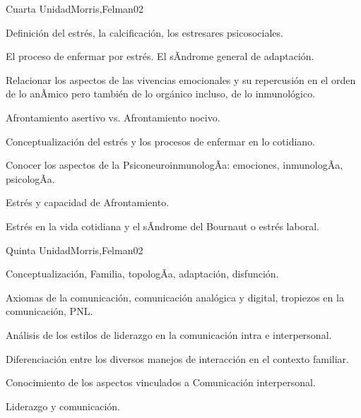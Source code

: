 \begin{syllabus}
\begin{unit}{Cuarta Unidad}{Morris,Felman}{0}{2}
\begin{topics}
	\item Definición del estrés, la calcificación, los estresares psicosociales.
	\item El proceso de enfermar por estrés. El sÃ­ndrome general de adaptación.
	\item Relacionar los aspectos de las vivencias emocionales y su repercusión en el orden de lo anÃ­mico pero también de lo orgánico incluso, de lo inmunológico.
	\item Afrontamiento asertivo vs. Afrontamiento nocivo.
\end{topics}
\begin{unitgoals}
	\item Conceptualización del estrés y los procesos de enfermar en lo cotidiano.
	\item Conocer los aspectos de la PsiconeuroinmunologÃ­a: emociones, inmunologÃ­a, psicologÃ­a.
	\item Estrés y capacidad de Afrontamiento.
	\item Estrés en la vida cotidiana y el sÃ­ndrome del Bournaut o estrés laboral.
\end{unitgoals}
\end{unit}

\begin{unit}{Quinta Unidad}{Morris,Felman}{0}{2}
\begin{topics}
	\item Conceptualización, Familia, topologÃ­a, adaptación, disfunción.
	\item Axiomas de la comunicación, comunicación analógica y digital, tropiezos en la comunicación, PNL.
	\item Análisis de los estilos de liderazgo en la comunicación intra e interpersonal.
\end{topics}
\begin{unitgoals}
	\item Diferenciación entre los diversos manejos de interacción en el contexto familiar.
	\item Conocimiento de los aspectos vinculados a Comunicación interpersonal.
	\item Liderazgo y comunicación.
\end{unitgoals}
\end{unit}


\end{syllabus}

